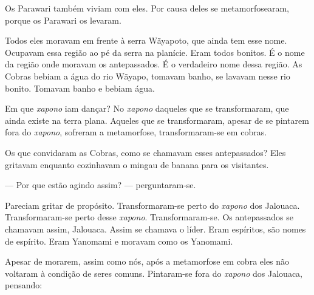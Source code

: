 

Os Parawari também viviam com eles. Por causa deles se metamorfosearam,
porque os Parawari os levaram. 

Todos eles moravam em frente à serra Wãyapoto, que ainda tem esse nome.
Ocupavam essa região ao pé da serra na planície. Eram todos bonitos. É o
nome da região onde moravam os antepassados. É o verdadeiro nome dessa
região. As Cobras bebiam a água do rio Wãyapo, tomavam banho, se lavavam
nesse rio bonito. Tomavam banho e bebiam água. 


Em que \textit{xapono} iam dançar? No \textit{xapono} daqueles que se transformaram, que ainda existe na terra plana. Aqueles que se transformaram, apesar de se
pintarem fora do \textit{xapono}, sofreram a metamorfose, transformaram-se em
cobras. 

Os que convidaram as Cobras, como se chamavam esses antepassados? Eles
gritavam enquanto cozinhavam o mingau de banana para os visitantes. 

--- Por que estão agindo assim? --- perguntaram-se.

Pareciam gritar de propósito. Transformaram-se perto do \textit{xapono} dos
Jalouaca. Transformaram-se perto desse \textit{xapono}. Transformaram-se. Os
antepassados se chamavam assim, Jalouaca. Assim se chamava o líder. Eram
espíritos, são nomes de espírito. Eram Yanomami e moravam como os
Yanomami. 

Apesar de morarem, 
assim como nós, após a metamorfose em cobra eles não
voltaram à condição de seres comuns. Pintaram-se fora do \textit{xapono} dos
Jalouaca, pensando: 

